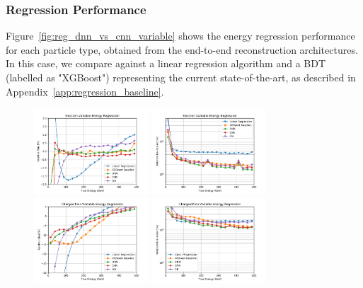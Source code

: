 \subsubsection{Regression Performance}
\label{sec:regression}

Figure~\ref{fig:reg_dnn_vs_cnn_variable} shows the energy regression performance for each particle type, obtained from the end-to-end reconstruction architectures. In this case, we compare against a linear regression algorithm and a BDT (labelled as "XGBoost") representing the current state-of-the-art, as described in Appendix~\ref{app:regression_baseline}. 

\begin{figure}[htbp]
\centering
\includegraphics[width=0.38\textwidth]{Images/Calo/bias_vs_E_Ele_variable.pdf}
\includegraphics[width=0.38\textwidth]{Images/Calo/res_vs_E_Ele_variable.pdf} \\
\includegraphics[width=0.38\textwidth]{Images/Calo/bias_vs_E_ChPi_variable.pdf}
\includegraphics[width=0.38\textwidth]{Images/Calo/res_vs_E_ChPi_variable.pdf} \\

\end{figure}
